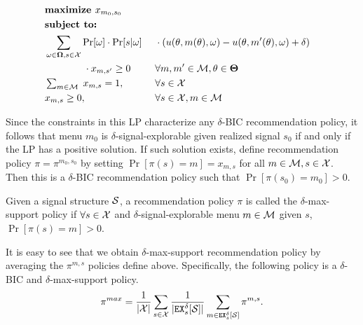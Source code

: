 \begin{figure}[H]
\begin{mdframed}
\begin{alignat*}{2}
 & \textbf{maximize }    x_{m_0,s_0}\  \\
&  \textbf{subject to: }\\
 & \sum_{\omega \in \varOmega, s \in \X} \Pr[\omega] \cdot \Pr[s | \omega] &  & \cdot \left(u(\theta, m(\theta), \omega) - u(\theta, m'(\theta), \omega) + \delta\right)\\
    &\qquad\qquad \cdot x_{m,s'} \geq 0  &\ & \forall m,m' \in \M, \theta \in \varTheta \\
& \textstyle  \sum_{m\in \M}\; x_{m,s} = 1,  \ &\ & \forall s \in \X \\
& x_{m,s} \geq 0,  \ &\ & \forall s \in \X, m\in \M 
\end{alignat*}
\end{mdframed}
\label{fig:nocc_lp}
\end{figure}

Since the constraints in this LP characterize any $\delta$-BIC recommendation policy, it follows that menu $m_0$ is $\delta$-signal-explorable given realized signal $s_0$ if and only if the LP has a positive solution. If such solution exists, define recommendation policy $\pi = \pi^{m_0,s_0}$ by setting $\Pr[\pi(s) = m] = x_{m,s}$ for all $m \in \M, s \in \X$. Then this is a $\delta$-BIC recommendation policy such that $\Pr[\pi(s_0) = m_0] > 0$.

\begin{definition}
Given a signal structure $\S$, a recommendation policy $\pi$ is called the $\delta$-max-support policy if $\forall s \in \X$  and $\delta$-signal-explorable menu $m\in \M$ given $s$, $\Pr[\pi(s) = m] > 0$.
\end{definition}

It is easy to see that we obtain $\delta$-max-support recommendation policy by averaging the $\pi^{m,s}$ policies define above.
Specifically, the following policy is a $\delta$-BIC and $\delta$-max-support policy.
\begin{align}
\label{eq:pimax2}
\pi^{max} = \frac{1}{|\X|} \sum_{s \in \X} \frac{1}{|\EX_s^{\delta}[\S]|} \sum_{m \in \EX_s^{\delta}[\S]} \pi^{m,s}.
\end{align}

